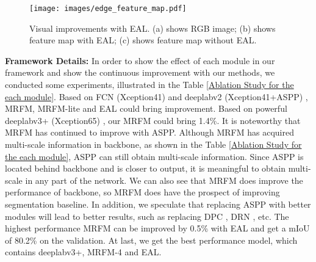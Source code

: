 \documentclass[final]{cvpr}
\begin{document}
\begin{figure}[t]
\begin{center}
\texttt{[image: images/edge\_feature\_map.pdf]}
\end{center}
\caption{Visual improvements with EAL. (a) shows RGB image; (b) shows feature map with EAL; (c) shows feature map without EAL.}
\label{edge compared image}
\vspace{-1em}
\end{figure}


\textbf{Framework Details: }In order to show the effect of each module in our framework and show the continuous improvement with our methods, we conducted some experiments, illustrated in the Table \ref{Ablation Study for the each module}. Based on FCN (Xception41) and deeplabv2 (Xception41+ASPP) \cite{Deeplabv2}, MRFM, MRFM-lite and EAL could bring improvement. Based on powerful deeplabv3+ (Xception65) \cite{Deeplabv3+}, our MRFM could bring 1.4\%. It is noteworthy that MRFM has continued to improve with ASPP. Although MRFM has acquired multi-scale information in backbone, as shown in the Table \ref{Ablation Study for the each module}, ASPP can still obtain multi-scale information. Since ASPP is located behind backbone and is closer to output, it is meaningful to obtain multi-scale in any part of the network. We can also see that MRFM does improve the performance of backbone, so MRFM does have the prospect of improving segmentation baseline. In addition, we speculate that replacing ASPP with better modules will lead to better results, such as replacing DPC \cite{chen2018searching}, DRN \cite{zhuang2018dense}, etc.
The highest performance MRFM can be improved by 0.5\% with EAL and get a mIoU of 80.2\% on the validation. At last, we get the best performance model, which contains deeplabv3+, MRFM-4 and EAL.
\end{document}
